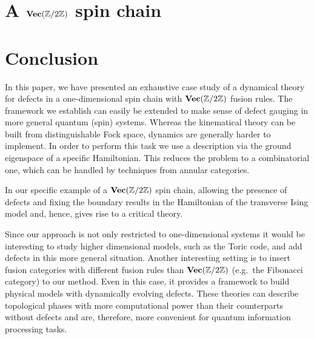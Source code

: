 






\section{A $\textbf{Vec}(\mathbb{Z}/2\mathbb{Z})$ spin chain}





\section{Conclusion}\label{Conclusion}
In this paper, we have presented an exhaustive case study of a dynamical theory for defects in a one-dimensional spin chain with $\textbf{Vec}(\mathbb{Z}/2\mathbb{Z})$ fusion rules. The framework we establish can easily be extended to make sense of defect gauging in more general quantum (spin) systems. Whereas the kinematical theory can be built from distinguishable Fock space, dynamics are generally harder to implement. In order to perform this task we use a description via the ground eigenspace of a specific Hamiltonian. This reduces the problem to a combinatorial one, which can be handled by techniques from annular categories.

In our specific example of a $\textbf{Vec}(\mathbb{Z}/2\mathbb{Z})$ spin chain, allowing the presence of defects and fixing the boundary results in the Hamiltonian of the transverse Ising model and, hence, gives rise to a critical theory.

Since our approach is not only restricted to one-dimensional systems it would be interesting to study higher dimensional models, such as the Toric code, and add defects in this more general situation. Another interesting setting is to insert fusion categories with different fusion rules than $\textbf{Vec}(\mathbb{Z}/2\mathbb{Z})$ (e.g.\ the Fibonacci category) to our method. Even in this case, it provides a framework to build physical models with dynamically evolving defects. These theories can describe topological phases with more computational power than their counterparts without defects and are, therefore, more convenient for quantum information processing tasks.





%



%

